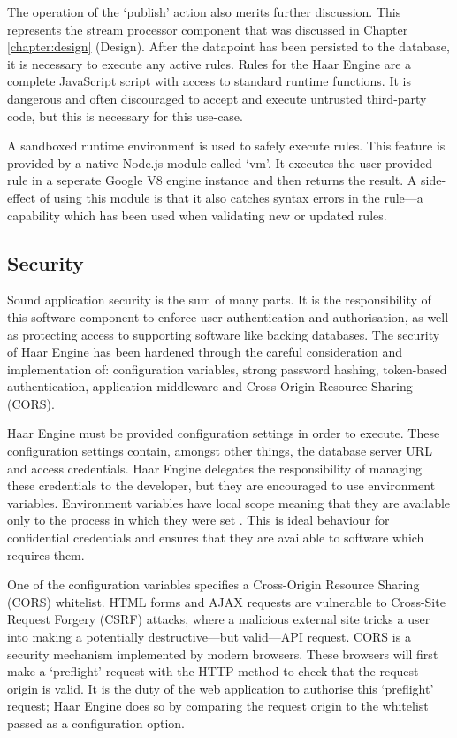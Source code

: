       The operation of the `publish' action also merits further discussion. This represents the stream processor component that was discussed in Chapter \ref{chapter:design} (Design). After the datapoint has been persisted to the database, it is necessary to execute any active rules. Rules for the Haar Engine are a complete JavaScript script with access to standard runtime functions. It is dangerous and often discouraged to accept and execute untrusted third-party code, but this is necessary for this use-case.

      A sandboxed runtime environment is used to safely execute rules. This feature is provided by a native Node.js module called `vm'. It executes the user-provided rule in a seperate Google V8 engine instance and then returns the result. A side-effect of using this module is that it also catches syntax errors in the rule---a capability which has been used when validating new or updated rules.

    \subsection{Security}
      Sound application security is the sum of many parts. It is the responsibility of this software component to enforce user authentication and authorisation, as well as protecting access to supporting software like backing databases. The security of Haar Engine has been hardened through the careful consideration and implementation of: configuration variables, strong password hashing, token-based authentication, application middleware and Cross-Origin Resource Sharing (CORS).

      Haar Engine must be provided configuration settings in order to execute. These configuration settings contain, amongst other things, the database server URL and access credentials. Haar Engine delegates the responsibility of managing these credentials to the developer, but they are encouraged to use environment variables. Environment variables have local scope meaning that they are available only to the process in which they were set \citep{env-vars}. This is ideal behaviour for confidential credentials and ensures that they are available to software which requires them.

      One of the configuration variables specifies a Cross-Origin Resource Sharing (CORS) whitelist. HTML forms and AJAX requests are vulnerable to Cross-Site Request Forgery (CSRF) attacks, where a malicious external site tricks a user into making a potentially destructive---but valid---API request. CORS is a security mechanism implemented by modern browsers. These browsers will first make a `preflight' request with the  HTTP method to check that the request origin is valid. It is the duty of the web application to authorise this `preflight' request; Haar Engine does so by comparing the request origin to the whitelist passed as a configuration option.

